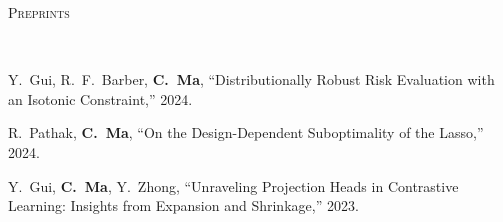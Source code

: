 \documentclass[a4paper, 10pt]{article}
\newenvironment{changemargin}[2]{%
  \begin{list}{}{%
    \setlength{\topsep}{0pt}%
    \setlength{\leftmargin}{#1}%
    \setlength{\rightmargin}{#2}%
    \setlength{\listparindent}{\parindent}%
    \setlength{\itemindent}{\parindent}%
    \setlength{\parsep}{\parskip}%
  }%
  \item[]}{\end{list}
}
\newcommand{\lineover}{
	\begin{changemargin}{-0.05in}{-0.05in}
		\vspace*{-8pt}
		\hrulefill \\
		\vspace*{-2pt}
	\end{changemargin}
}
\newcommand{\header}[1]{
	\begin{changemargin}{-0.5in}{-0.5in}
		\scshape{#1}\\
  	\lineover
	\end{changemargin}
}
\newenvironment{body} {
	\vspace*{-16pt}
	\begin{changemargin}{-0.3in}{-0.5in}
  }	
	{\end{changemargin}
}
\begin{document}
%



\bigskip
\header{\LARGE{Preprints}}
\begin{body}
	\vspace{18pt}
	\begin{enumerate}[label={[{P}{{\arabic*}}]}]
	
\item Y.~Gui, R.~F.~Barber, \textbf{C.~Ma}, ``Distributionally Robust Risk Evaluation with an Isotonic Constraint,'' 2024.



\item R.~Pathak, \textbf{C.~Ma}, ``On the Design-Dependent Suboptimality of the Lasso,'' 2024.
\item Y.~Gui, \textbf{C.~Ma}, Y.~Zhong, ``Unraveling Projection Heads in Contrastive Learning: Insights from Expansion and Shrinkage,'' 2023.










	\end{enumerate}
\end{body}
\end{document}
